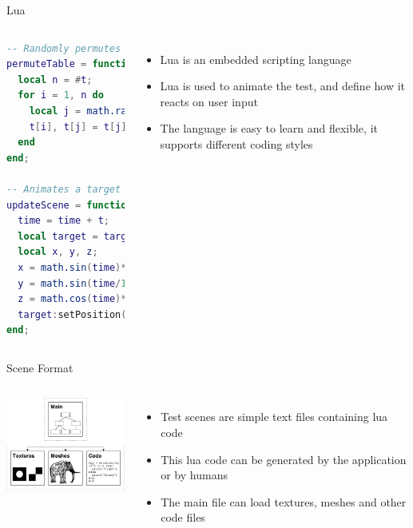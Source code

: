 \documentclass[12pt,ucs,hyperref={pdftext}]{beamer}
\newlength{\columnleft}
\newlength{\columnright}
\begin{document}
\begin{frame}[fragile]{Lua}
\begin{columns}

\column{\columnleft}

\begin{lstlisting}[language=lua]
-- Randomly permutes a table
permuteTable = function (t)
  local n = #t;
  for i = 1, n do
    local j = math.random(i,n);
    t[i], t[j] = t[j], t[i];
  end
end;

-- Animates a target
updateScene = function (t)
  time = time + t;
  local target = targets[2];
  local x, y, z;
  x = math.sin(time)*3-1;
  y = math.sin(time/10)*2;
  z = math.cos(time)*2;
  target:setPosition({x,y,z});
end;
\end{lstlisting}

\column{\columnright}
\begin{itemize}%
\item Lua is an embedded scripting language
\item Lua is used to animate the test, and define how it reacts on user input
\item The language is easy to learn and flexible, it supports different coding styles
\end{itemize}

\end{columns}
\end{frame}

\begin{frame}{Scene Format}
\begin{columns}

\column{\columnleft}

\begin{center}
\includegraphics[width=5cm]{media/document2.pdf}
\end{center}

\column{\columnright}
\begin{itemize}%
\item Test scenes are simple text files containing lua code
\item This lua code can be generated by the application or by humans
\item The main file can load textures, meshes and other code files
\end{itemize}

\end{columns}
\end{frame}
\end{document}
